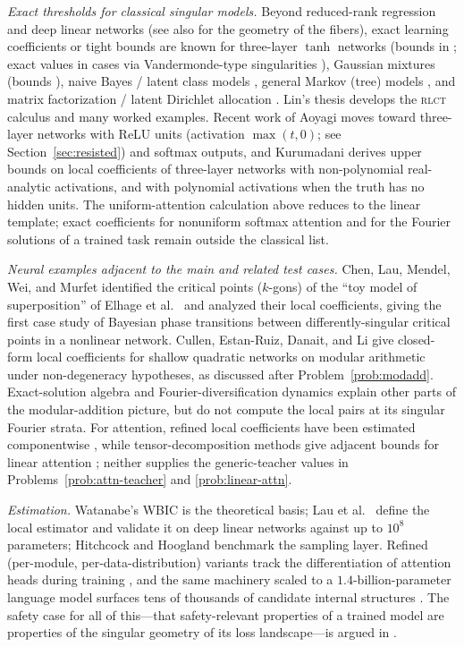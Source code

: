 \documentclass[11pt]{amsart}
\theoremstyle{plain}
\theoremstyle{definition}
\begin{document}
\emph{Exact thresholds for classical singular models.} Beyond reduced-rank regression \cite{aoyagi2005} and deep linear networks \cite{aoyagi2024} (see also \cite{lehalleur2024} for the geometry of the fibers), exact learning coefficients or tight bounds are known for three-layer $\tanh$ networks (bounds in \cite{watanabe2001}; exact values in cases via Vandermonde-type singularities \cite{aoyagi2009}), Gaussian mixtures (bounds \cite{yamazaki2003}), naive Bayes / latent class models \cite{rusakov2005}, general Markov (tree) models \cite{zwiernik2011}, and matrix factorization / latent Dirichlet allocation \cite{hayashi2021}. Lin's thesis \cite{lin2011} develops the \textsc{rlct} calculus and many worked examples. Recent work of Aoyagi \cite{aoyagi2025} moves toward three-layer networks with ReLU units (activation $\max(t,0)$; see Section~\ref{sec:resisted}) and softmax outputs, and Kurumadani \cite{kurumadani2026} derives upper bounds on local coefficients of three-layer networks with non-polynomial real-analytic activations, and with polynomial activations when the truth has no hidden units. The uniform-attention calculation above reduces to the linear template; exact coefficients for nonuniform softmax attention and for the Fourier solutions of a trained task remain outside the classical list.

\emph{Neural examples adjacent to the main and related test cases.} Chen, Lau, Mendel, Wei, and Murfet \cite{chen2023} identified the critical points ($k$-gons) of the ``toy model of superposition'' of Elhage et al.\ \cite{elhage2022} and analyzed their local coefficients, giving the first case study of Bayesian phase transitions between differently-singular critical points in a nonlinear network. Cullen, Estan-Ruiz, Danait, and Li \cite{cullen2026} give closed-form local coefficients for shallow quadratic networks on modular arithmetic under non-degeneracy hypotheses, as discussed after Problem~\ref{prob:modadd}. Exact-solution algebra \cite{tian2024,mccracken2025} and Fourier-diversification dynamics \cite{he2026} explain other parts of the modular-addition picture, but do not compute the local pairs at its singular Fourier strata. For attention, refined local coefficients have been estimated componentwise \cite{wang2024}, while tensor-decomposition methods give adjacent bounds for linear attention \cite{yoshida2023}; neither supplies the generic-teacher values in Problems~\ref{prob:attn-teacher} and \ref{prob:linear-attn}.

\emph{Estimation.} Watanabe's WBIC \cite{watanabe2013} is the theoretical basis; Lau et al.\ \cite{lau2023} define the local estimator and validate it on deep linear networks against \cite{aoyagi2024} up to $10^8$ parameters; Hitchcock and Hoogland \cite{hitchcock2025} benchmark the sampling layer. Refined (per-module, per-data-distribution) variants track the differentiation of attention heads during training \cite{wang2024}, and the same machinery scaled to a $1.4$-billion-parameter language model surfaces tens of thousands of candidate internal structures \cite{murfet2026}. The safety case for all of this---that safety-relevant properties of a trained model are properties of the singular geometry of its loss landscape---is argued in \cite{lehalleur2025}.
\end{document}
